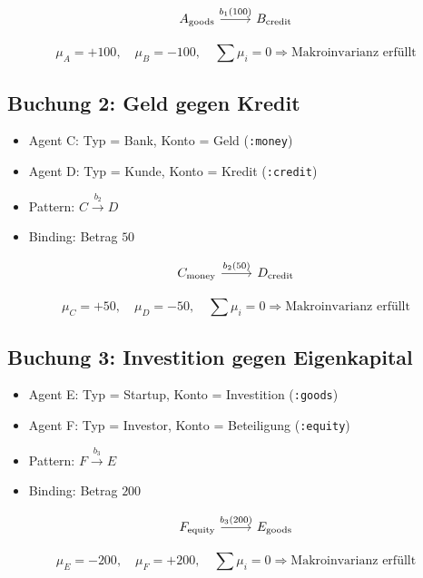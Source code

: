 \documentclass{article}
\begin{document}
\[
\begin{tikzcd}
A_{\text{goods}} \arrow[r, "b_1(100)"] & B_{\text{credit}}
\end{tikzcd}
\]

\[
\mu_A = +100, \quad \mu_B = -100, \quad \sum \mu_i = 0 \Rightarrow \text{Makroinvarianz erfüllt}
\]

\subsection*{Buchung 2: Geld gegen Kredit}

\begin{itemize}
  \item Agent C: Typ = Bank, Konto = Geld (\texttt{:money})
  \item Agent D: Typ = Kunde, Konto = Kredit (\texttt{:credit})
  \item Pattern: \( C \xrightarrow{b_2} D \)
  \item Binding: Betrag \( 50 \)
\end{itemize}

\[
\begin{tikzcd}
C_{\text{money}} \arrow[r, "b_2(50)"] & D_{\text{credit}}
\end{tikzcd}
\]

\[
\mu_C = +50, \quad \mu_D = -50, \quad \sum \mu_i = 0 \Rightarrow \text{Makroinvarianz erfüllt}
\]

\subsection*{Buchung 3: Investition gegen Eigenkapital}

\begin{itemize}
  \item Agent E: Typ = Startup, Konto = Investition (\texttt{:goods})
  \item Agent F: Typ = Investor, Konto = Beteiligung (\texttt{:equity})
  \item Pattern: \( F \xrightarrow{b_3} E \)
  \item Binding: Betrag \( 200 \)
\end{itemize}

\[
\begin{tikzcd}
F_{\text{equity}} \arrow[r, "b_3(200)"] & E_{\text{goods}}
\end{tikzcd}
\]

\[
\mu_E = -200, \quad \mu_F = +200, \quad \sum \mu_i = 0 \Rightarrow \text{Makroinvarianz erfüllt}
\]
\end{document}
